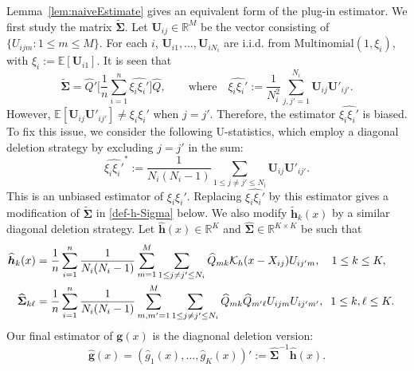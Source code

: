 \documentclass[preprint,11pt]{article}
\numberwithin{equation}{section}
\newcommand{\beq}{\begin{equation}}
\newcommand{\eeq}{\end{equation}}
\begin{document}
Lemma~\ref{lem:naiveEstimate} gives an equivalent form of the plug-in estimator. We first study the matrix $\widetilde{\boldsymbol \Sigma}$. Let $\boldsymbol{U}_{ij}\in\mathbb{R}^M$ be the vector consisting of $\{U_{ijm}: 1\leq m\leq M\}$. For each $i$, $\boldsymbol{U}_{i1}, \ldots, \boldsymbol{U}_{iN_i}$ are i.i.d. from $\mathrm{Multinomial}(1, \xi_i)$, with $\xi_i := \mathbb{E}[\boldsymbol{U}_{i1}]$. It is seen that
\[
\widetilde{\boldsymbol \Sigma} = \widehat{Q}'\biggl[ \frac{1}{n}\sum_{i=1}^n \widehat{\xi_i\xi_i'}\biggr] \widehat{Q}, \qquad\mbox{where}\quad \widehat{\xi_i\xi_i'}:=\frac{1}{N^2_i}\sum_{j,j'=1}^{N_i}\boldsymbol{U}_{ij}\boldsymbol{U}'_{ij'}. 
\]
However, $\mathbb{E}[\boldsymbol{U}_{ij}\boldsymbol{U}'_{ij'}]\neq \xi_i\xi_i'$ when $j=j'$. Therefore, the estimator $\widehat{\xi_i\xi_i'}$ is biased. To fix this issue, we consider the following U-statistics, which employ a diagonal deletion strategy by excluding $j=j'$ in the sum:
\[
\widehat{\xi_i\xi_i'}^*:=\frac{1}{N_i(N_i-1)}\sum_{1\leq j\neq j'\leq N_i}\boldsymbol{U}_{ij}\boldsymbol{U}'_{ij'}.
\]
This is an unbiased estimator of $\xi_i\xi_i'$. 
Replacing $\widehat{\xi_i\xi_i'}$ by this estimator gives a modification of $\widetilde{\boldsymbol \Sigma}$ in \eqref{def-h-Sigma} below. We also modify $\widetilde{\boldsymbol h}_k(x)$ by a similar diagonal deletion strategy.  
%
%
Let $\widehat{\boldsymbol h}(x)\in\mathbb{R}^K$ and $\widehat{\boldsymbol \Sigma} \in\mathbb{R}^{K\times K}$ be such that 
\begin{align} \label{def-h-Sigma}
\widehat{\boldsymbol h}_k(x) & = \frac{1}{n}\sum_{i=1}^n \frac{1}{N_i(N_i-1)} \sum_{m=1}^M\sum_{1\leq j\neq j'\leq N_i} \widehat{Q}_{mk} {\cal K}_h(x-X_{ij})U_{ij'm},\quad 1\leq k\leq K,\cr
\widehat{\boldsymbol \Sigma}_{k\ell} &= \frac{1}{n}\sum_{i=1}^n \frac{1}{N_i(N_i-1)} \sum_{m, m'=1}^M \sum_{1\leq j\neq j'\leq N_i} \widehat{Q}_{mk}\widehat{Q}_{m'\ell}U_{ijm}U_{ij'm'}, \;\; 1\leq k,\ell\leq K. 
\end{align}
Our final estimator of $\boldsymbol{g}(x)$ is the diagnonal deletion version:
\beq \label{g-estimate-final}
\widehat{{\boldsymbol g}}(x)= (\hat{g}_1(x), \ldots, \hat{g}_K(x))':= \widehat{\boldsymbol \Sigma}^{-1}\widehat{\boldsymbol h}(x). 
\eeq 
\end{document}
